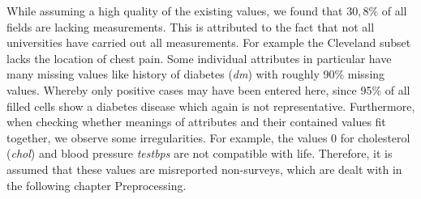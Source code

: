 While assuming a high quality of the existing values, we found that $30,8\%$ of all fields are lacking measurements. This is attributed to the fact that not all universities have carried out all measurements.  For example the Cleveland subset lacks the location of chest pain. Some individual attributes in particular have many missing values like history of diabetes (\textit{dm}) with roughly 90\% missing values. Whereby only positive cases may have been entered here, since 95\% of all filled cells show a diabetes disease which again is not representative. Furthermore, when checking whether meanings of attributes and their contained values fit together, we observe some irregularities. For example, the values 0 for cholesterol (\textit{chol}) and blood pressure \textit{testbps} are not compatible with life. Therefore, it is assumed that these values are misreported non-surveys, which are dealt with in the following chapter Preprocessing. 
